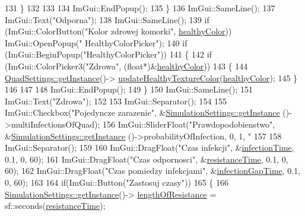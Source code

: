 \begin{DoxyCode}
131         \}
132             
133 
134         ImGui::EndPopup();
135     \}
136     ImGui::SameLine();
137     ImGui::Text(\textcolor{stringliteral}{"Odporna"});
138     ImGui::SameLine();
139     \textcolor{keywordflow}{if} (ImGui::ColorButton(\textcolor{stringliteral}{"Kolor zdrowej komorki"}, \mbox{\hyperlink{class_options_a2da8226b9f582ed5e1870857f045151f}{healthyColor}})) ImGui::OpenPopup(\textcolor{stringliteral}{"
      HealthyColorPicker"});
140     \textcolor{keywordflow}{if} (ImGui::BeginPopup(\textcolor{stringliteral}{"HealthyColorPicker"}))
141     \{
142         \textcolor{keywordflow}{if} (ImGui::ColorPicker3(\textcolor{stringliteral}{"Zdrowa"}, (\textcolor{keywordtype}{float}*)&\mbox{\hyperlink{class_options_a2da8226b9f582ed5e1870857f045151f}{healthyColor}}))
143         \{
144             \mbox{\hyperlink{class_quad_settings_a20d7cfd0c56c11adcdf75c5e3011de67}{QuadSettings::getInstance}}()->
      \mbox{\hyperlink{class_quad_settings_a82d6bd77e99f58c1a24122548449c6bc}{updateHealthyTextureColor}}(\mbox{\hyperlink{class_options_a2da8226b9f582ed5e1870857f045151f}{healthyColor}});
145         \}
146             
147 
148         ImGui::EndPopup();
149     \}
150     ImGui::SameLine();
151     ImGui::Text(\textcolor{stringliteral}{"Zdrowa"});
152 
153     ImGui::Separator();
154     
155     ImGui::Checkbox(\textcolor{stringliteral}{"Pojedyncze zarazenie"}, &\mbox{\hyperlink{class_simulation_settings_ab69bcd8bb611656b17d1f655d09a3004}{SimulationSettings::getInstance}}
      ()->multiInfectionsOfQuad);
156     ImGui::SliderFloat(\textcolor{stringliteral}{"Prawdopodobienstwo"}, &\mbox{\hyperlink{class_simulation_settings_ab69bcd8bb611656b17d1f655d09a3004}{SimulationSettings::getInstance}}
      ()->probabilityOfInfection, 0, 1, \textcolor{stringliteral}{"%
157 
158     ImGui::Separator();
159 
160     ImGui::DragFloat(\textcolor{stringliteral}{"Czas infekcji"}, &\mbox{\hyperlink{class_options_aef217faac2fc40d51e584cbc11c738d5}{infectionTime}}, 0.1, 0, 60);
161     ImGui::DragFloat(\textcolor{stringliteral}{"Czas odpornosci"}, &\mbox{\hyperlink{class_options_abbe6566b3ae55392365a1a89ece5ff72}{resistanceTime}}, 0.1, 0, 60);
162     ImGui::DragFloat(\textcolor{stringliteral}{"Czas pomiedzy infekcjami"}, &\mbox{\hyperlink{class_options_ad8957194973c1d0c3c861b187cde47b9}{infectionGapTime}}, 0.1, 0, 60);
163 
164     \textcolor{keywordflow}{if}(ImGui::Button(\textcolor{stringliteral}{"Zastosuj czasy"}))
165     \{
166         \mbox{\hyperlink{class_simulation_settings_ab69bcd8bb611656b17d1f655d09a3004}{SimulationSettings::getInstance}}()->
      \mbox{\hyperlink{class_simulation_settings_a1c7091242ba583df542bd22643ccc509}{lengthOfResistance}} = sf::seconds(\mbox{\hyperlink{class_options_abbe6566b3ae55392365a1a89ece5ff72}{resistanceTime}});
}
\end{DoxyCode}
